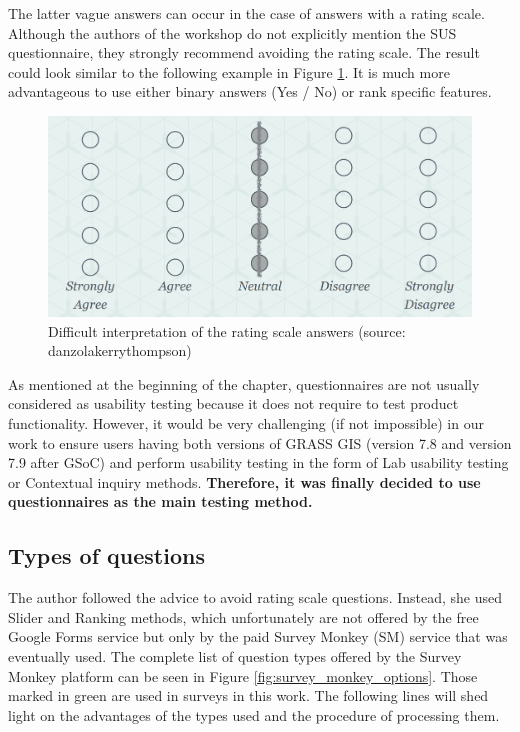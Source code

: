 \documentclass[a4paper,10pt,twoside]{article}
\begin{document}
\noindent The latter vague answers can occur in the case of answers
with a rating scale. Although the authors of the workshop do not
explicitly mention the SUS questionnaire, they strongly recommend
avoiding the rating scale. The result could look similar to the
following example in Figure \ref{fig:blur_scale}. It is much more
advantageous to use either binary answers (Yes / No) or rank specific
features.

\vspace{0.3cm}
\begin{figure}[hbt!] 
\begin{center}
\includegraphics[width=12.5cm]{../pictures/blur_scale.png} 
\caption[Difficult interpretation of the rating scale answers]{Difficult interpretation of the rating scale answers (source: danzolakerrythompson)}
\label{fig:blur_scale}
\end{center}
\end{figure}

\noindent As mentioned at the beginning of the chapter, questionnaires
are not usually considered as usability testing because it does not
require to test product functionality. However, it would be very
challenging (if not impossible) in our work to ensure users having
both versions of GRASS GIS (version 7.8 and version 7.9 after GSoC)
and perform usability testing in the form of Lab usability testing or
Contextual inquiry methods. \textbf{Therefore, it was finally decided
  to use questionnaires as the main testing method.}

\subsection{Types of questions}

\noindent The author followed the advice to avoid rating scale
questions. Instead, she used Slider and Ranking methods, which
unfortunately are not offered by the free Google Forms service but
only by the paid Survey Monkey (SM) service that was eventually
used. The complete list of question types offered by the Survey Monkey
platform can be seen in Figure \ref{fig:survey_monkey_options}. Those
marked in green are used in surveys in this work. The following lines
will shed light on the advantages of the types used and the procedure
of processing them.
\end{document}

